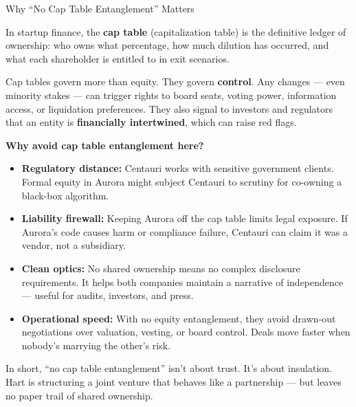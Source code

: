 \begin{TechnicalSidebar}{Why “No Cap Table Entanglement” Matters}

  In startup finance, the \textbf{cap table} (capitalization table) is the definitive ledger of ownership:  
  who owns what percentage, how much dilution has occurred, and what each shareholder is entitled to in exit scenarios.
  
  \medskip
  
  Cap tables govern more than equity. They govern \textbf{control}.  
  Any changes — even minority stakes — can trigger rights to board seats, voting power, information access, or liquidation preferences.  
  They also signal to investors and regulators that an entity is \textbf{financially intertwined}, which can raise red flags.
  
  \medskip
  
  \textbf{Why avoid cap table entanglement here?}

  \medskip
  
  \begin{itemize}
    \item \textbf{Regulatory distance:} Centauri works with sensitive government clients. Formal equity in Aurora might subject Centauri to scrutiny for co-owning a black-box algorithm.
    
    \item \textbf{Liability firewall:} Keeping Aurora off the cap table limits legal exposure. If Aurora’s code causes harm or compliance failure, Centauri can claim it was a vendor, not a subsidiary.
    
    \item \textbf{Clean optics:} No shared ownership means no complex disclosure requirements. It helps both companies maintain a narrative of independence — useful for audits, investors, and press.
  
    \item \textbf{Operational speed:} With no equity entanglement, they avoid drawn-out negotiations over valuation, vesting, or board control. Deals move faster when nobody’s marrying the other’s risk.
  
  \end{itemize}

  \medskip
  
  In short, ``no cap table entanglement'' isn’t about trust. It’s about insulation.  
  Hart is structuring a joint venture that behaves like a partnership — but leaves no paper trail of shared ownership.
  
\end{TechnicalSidebar}

